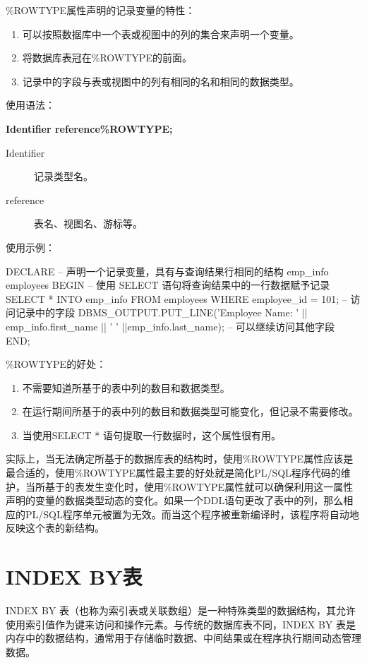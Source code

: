 \documentclass[11pt, a4paper, oneside, UTF8]{ctexbook}
\let\kaishu\relax %
\begin{document}
\%ROWTYPE属性声明的记录变量的特性：
\begin{enumerate}
  \item 可以按照数据库中一个表或视图中的列的集合来声明一个变量。
  \item 将数据库表冠在\%ROWTYPE的前面。
  \item 记录中的字段与表或视图中的列有相同的名和相同的数据类型。
\end{enumerate}

使用语法：

{\bfseries\kaishu Identifier reference\%ROWTYPE;}

\begin{description}
  \item[Identifier] 记录类型名。
  \item[reference] 表名、视图名、游标等。
\end{description}

使用示例：
\begin{plsql}[caption=\%ROWTYPE示例代码]
DECLARE
  -- 声明一个记录变量，具有与查询结果行相同的结构
  emp_info employees%
BEGIN
  -- 使用 SELECT 语句将查询结果中的一行数据赋予记录
  SELECT * INTO emp_info FROM employees WHERE employee_id = 101;
  -- 访问记录中的字段
  DBMS_OUTPUT.PUT_LINE('Employee Name: ' || emp_info.first_name || ' ' ||emp_info.last_name);
  -- 可以继续访问其他字段
END;
\end{plsql}

\%ROWTYPE的好处：
\begin{enumerate}
  \item 不需要知道所基于的表中列的数目和数据类型。
  \item 在运行期间所基于的表中列的数目和数据类型可能变化，但记录不需要修改。
  \item 当使用SELECT * 语句提取一行数据时，这个属性很有用。
\end{enumerate}

实际上，当无法确定所基于的数据库表的结构时，使用\%ROWTYPE属性应该是最合适的，使用\%ROWTYPE属性最主要的好处就是简化PL/SQL程序代码的维护，当所基于的表发生变化时，使用\%ROWTYPE属性就可以确保利用这一属性声明的变量的数据类型动态的变化。如果一个DDL语句更改了表中的列，那么相应的PL/SQL程序单元被置为无效。而当这个程序被重新编译时，该程序将自动地反映这个表的新结构。

\section{INDEX BY表}
INDEX BY 表（也称为索引表或关联数组）是一种特殊类型的数据结构，其允许使用索引值作为键来访问和操作元素。与传统的数据库表不同，INDEX BY 表是内存中的数据结构，通常用于存储临时数据、中间结果或在程序执行期间动态管理数据。
\end{document}
